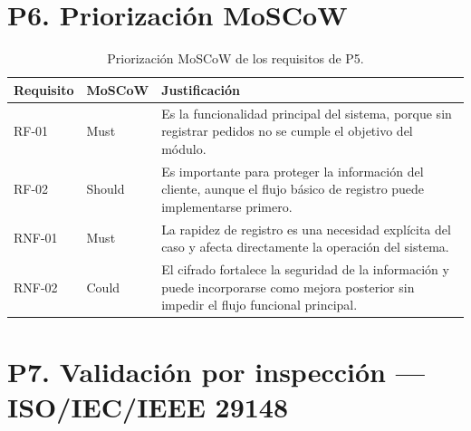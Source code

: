 \documentclass[12pt,a4paper]{article}
\begin{document}
\section{P6. Priorización MoSCoW}

\begin{table}[H]
\centering
\small
\begin{tabularx}{\textwidth}{|p{2cm}|p{2.2cm}|X|}
\hline
\textbf{Requisito} & \textbf{MoSCoW} & \textbf{Justificación} \\
\hline
RF-01 & Must & Es la funcionalidad principal del sistema, porque sin registrar pedidos no se cumple el objetivo del módulo. \\
\hline
RF-02 & Should & Es importante para proteger la información del cliente, aunque el flujo básico de registro puede implementarse primero. \\
\hline
RNF-01 & Must & La rapidez de registro es una necesidad explícita del caso y afecta directamente la operación del sistema. \\
\hline
RNF-02 & Could & El cifrado fortalece la seguridad de la información y puede incorporarse como mejora posterior sin impedir el flujo funcional principal. \\
\hline
\end{tabularx}
\caption{Priorización MoSCoW de los requisitos de P5.}
\end{table}

\section{P7. Validación por inspección --- ISO/IEC/IEEE 29148}
\end{document}
